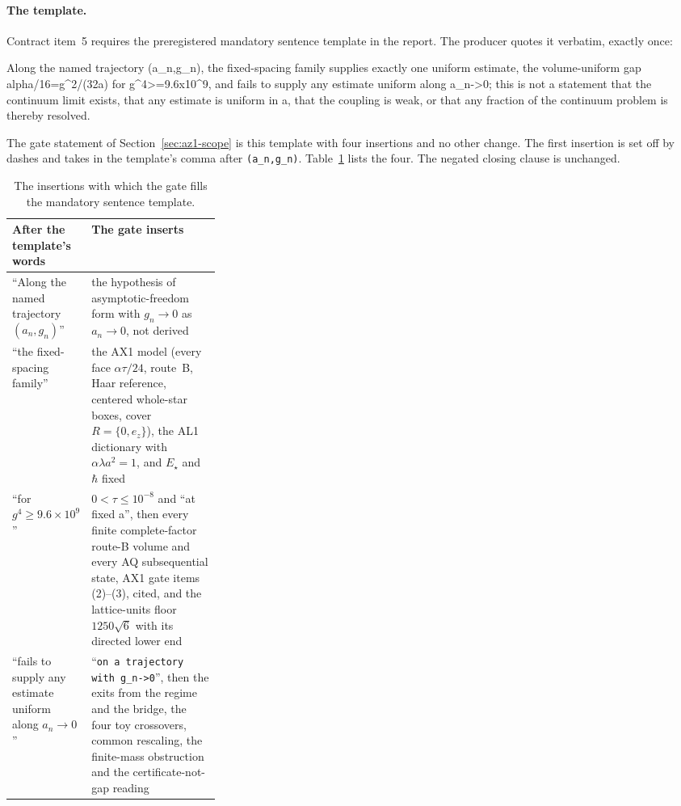 \paragraph{The template.}
Contract item~5 requires the preregistered mandatory sentence template in the
report. The producer quotes it verbatim, exactly once:
\begin{gatequote}
Along the named trajectory (a\_n,g\_n), the fixed-spacing family supplies
exactly one uniform estimate, the volume-uniform gap
alpha/16=g\textasciicircum{}2/(32a) for
g\textasciicircum{}4>=9.6x10\textasciicircum{}9, and fails to supply any
estimate uniform along a\_n->0; this is not a statement that the continuum
limit exists, that any estimate is uniform in a, that the coupling is weak, or
that any fraction of the continuum problem is thereby resolved.
\end{gatequote}
The gate statement of Section~\ref{sec:az1-scope} is this template with four
insertions and no other change. The first insertion is set off by dashes and
takes in the template's comma after \texttt{(a\_n,g\_n)}.
Table~\ref{tab:az1-template} lists the four. The negated closing clause is
unchanged.

\begin{table}[htbp]
\centering\small
\caption{The insertions with which the gate fills the mandatory sentence
template.}
\label{tab:az1-template}
\begin{tabularx}{\linewidth}{@{}>{\raggedright\arraybackslash}p{0.3\linewidth}
 >{\raggedright\arraybackslash}X@{}}
\toprule
After the template's words & The gate inserts\\
\midrule
``Along the named trajectory $(a_n,g_n)$'' & the hypothesis of
asymptotic-freedom form with $g_n\to0$ as $a_n\to0$, not derived\\[2pt]
``the fixed-spacing family'' & the AX1 model (every face $\alpha\tau/24$,
route~B, Haar reference, centered whole-star boxes, cover $R=\{0,e_z\}$), the
AL1 dictionary with $\alpha\lambda a^2=1$, and $E_\star$ and $\hbar$
fixed\\[2pt]
``for $g^4\ge9.6\times10^9$'' & $0<\tau\le10^{-8}$ and ``at fixed a'', then
every finite complete-factor route-B volume and every AQ subsequential state,
AX1 gate items (2)--(3), cited, and the lattice-units floor $1250\sqrt6$ with
its directed lower end\\[2pt]
``fails to supply any estimate uniform along $a_n\to0$'' &
``\texttt{on a trajectory with g\_n->0}'', then the exits from the regime and the bridge, the
four toy crossovers, common rescaling, the finite-mass obstruction and the
certificate-not-gap reading\\
\bottomrule
\end{tabularx}
\end{table}

